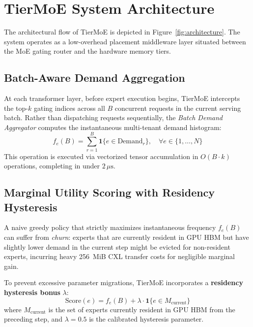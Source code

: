\documentclass[10pt,journal,compsoc]{IEEEtran}
\begin{document}
\section{TierMoE System Architecture}
\label{sec:tiermoe}

The architectural flow of TierMoE is depicted in Figure~\ref{fig:architecture}. The system operates as a low-overhead placement middleware layer situated between the MoE gating router and the hardware memory tiers.

\subsection{Batch-Aware Demand Aggregation}
At each transformer layer, before expert execution begins, TierMoE intercepts the top-$k$ gating indices across all $B$ concurrent requests in the current serving batch. Rather than dispatching requests sequentially, the \emph{Batch Demand Aggregator} computes the instantaneous multi-tenant demand histogram:
\begin{equation}
    f_e(B) = \sum_{r=1}^B \mathbf{1}\{e \in \text{Demand}_r\}, \quad \forall e \in \{1, \dots, N\}
\end{equation}
This operation is executed via vectorized tensor accumulation in $O(B \cdot k)$ operations, completing in under $2\,\mu\text{s}$.

\subsection{Marginal Utility Scoring with Residency Hysteresis}
A naive greedy policy that strictly maximizes instantaneous frequency $f_e(B)$ can suffer from \emph{churn}: experts that are currently resident in GPU HBM but have slightly lower demand in the current step might be evicted for non-resident experts, incurring heavy 256~MiB CXL transfer costs for negligible marginal gain.

To prevent excessive parameter migrations, TierMoE incorporates a \textbf{residency hysteresis bonus} $\lambda$:
\begin{equation}
    \text{Score}(e) = f_e(B) + \lambda \cdot \mathbf{1}\{e \in M_{\text{current}}\}
    \label{eq:scoring}
\end{equation}
where $M_{\text{current}}$ is the set of experts currently resident in GPU HBM from the preceding step, and $\lambda = 0.5$ is the calibrated hysteresis parameter. 
\end{document}
